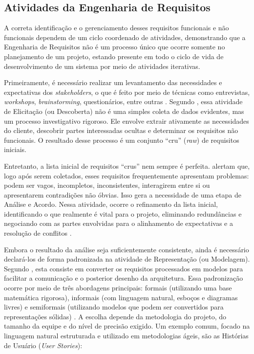 \subsection{Atividades da Engenharia de Requisitos}

A correta identificação e o gerenciamento desses requisitos funcionais e não funcionais dependem de um ciclo coordenado de atividades, demonstrando que a Engenharia de Requisitos não é um processo único que ocorre somente no planejamento de um projeto, estando presente em todo o ciclo de vida de desenvolvimento de um sistema por meio de atividades iterativas.

Primeiramente, é necessário realizar um levantamento das necessidades e expectativas dos \textit{stakeholders}, o que é feito por meio de técnicas como entrevistas, \textit{workshops}, \textit{brainstorming}, questionários, entre outras \cite{junior2025}. Segundo , essa atividade de Elicitação (ou Descoberta) não é uma simples coleta de dados evidentes, mas um processo investigativo rigoroso. Ele envolve extrair ativamente as necessidades do cliente, descobrir partes interessadas ocultas e determinar os requisitos não funcionais. O resultado desse processo é um conjunto ``cru'' (\textit{raw}) de requisitos iniciais.

Entretanto, a lista inicial de requisitos ``crus'' nem sempre é perfeita.  alertam que, logo após serem coletados, esses requisitos frequentemente apresentam problemas: podem ser vagos, incompletos, inconsistentes, interagirem entre si ou apresentarem contradições não óbvias. Isso gera a necessidade de uma etapa de Análise e Acordo. Nessa atividade, ocorre o refinamento da lista inicial, identificando o que realmente é vital para o projeto, eliminando redundâncias e negociando com as partes envolvidas para o alinhamento de expectativas e a resolução de conflitos \cite{junior2025}.

Embora o resultado da análise seja suficientemente consistente, ainda é necessário declará-los de forma padronizada na atividade de Representação (ou Modelagem). Segundo , esta consiste em converter os requisitos processados em modelos para facilitar a comunicação e o posterior desenho da arquitetura. Essa padronização ocorre por meio de três abordagens principais: formais (utilizando uma base matemática rigorosa), informais (com linguagem natural, esboços e diagramas livres) e semiformais (utilizando modelos que podem ser convertidos para representações sólidas) \cite{laplante2022}. A escolha depende da metodologia do projeto, do tamanho da equipe e do nível de precisão exigido. Um exemplo comum, focado na linguagem natural estruturada e utilizado em metodologias ágeis, são as Histórias de Usuário (\textit{User Stories}):

